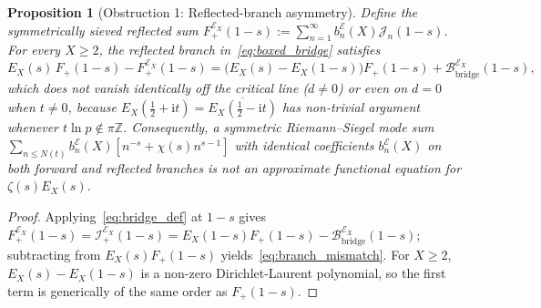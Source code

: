 \documentclass[11pt,reqno]{amsart}
\theoremstyle{plain}
\newtheorem{proposition}[theorem]{Proposition}
\theoremstyle{definition}
\theoremstyle{remark}
\numberwithin{equation}{section}
\newcommand{\ii}{\mathrm{i}}
\begin{document}
\begin{proposition}[Obstruction 1: Reflected-branch asymmetry]\label{prop:branch_asymmetry}
Define the symmetrically sieved reflected sum $F_+^{\mathcal{E}_X}(1 - s) := \sum_{n=1}^{\infty} b_n^{\mathcal{E}}(X)\mathcal{J}_n(1 - s)$. For every $X \ge 2$, the reflected branch in~\eqref{eq:boxed_bridge} satisfies
\begin{equation}\label{eq:branch_mismatch}
E_X(s)\,F_+(1 - s) - F_+^{\mathcal{E}_X}(1 - s) = \bigl(E_X(s) - E_X(1 - s)\bigr)F_+(1 - s) + \mathcal{B}_{\mathrm{bridge}}^{\mathcal{E}_X}(1 - s),
\end{equation}
which does not vanish identically off the critical line ($d \neq 0$) or even on $d = 0$ when $t \neq 0$, because $E_X(\frac{1}{2} + \ii t) = \overline{E_X(\frac{1}{2} - \ii t)}$ has non-trivial argument whenever $t\ln p \notin \pi\mathbb{Z}$. Consequently, a symmetric Riemann--Siegel mode sum $\sum_{n \le N(t)} b_n^{\mathcal{E}}(X)[n^{-s} + \chi(s)n^{s-1}]$ with identical coefficients $b_n^{\mathcal{E}}(X)$ on both forward and reflected branches is \emph{not} an approximate functional equation for $\zeta(s)E_X(s)$.
\end{proposition}

\begin{proof}
Applying~\eqref{eq:bridge_def} at $1 - s$ gives $F_+^{\mathcal{E}_X}(1 - s) = \mathcal{I}_+^{\mathcal{E}_X}(1 - s) = E_X(1 - s)F_+(1 - s) - \mathcal{B}_{\mathrm{bridge}}^{\mathcal{E}_X}(1 - s)$; subtracting from $E_X(s)F_+(1 - s)$ yields~\eqref{eq:branch_mismatch}. For $X \ge 2$, $E_X(s) - E_X(1 - s)$ is a non-zero Dirichlet-Laurent polynomial, so the first term is generically of the same order as $F_+(1 - s)$.
\end{proof}
\end{document}
